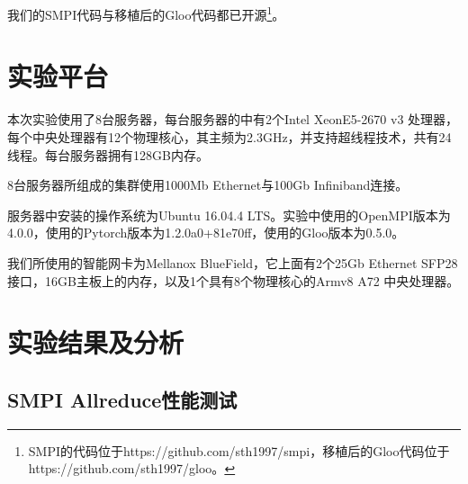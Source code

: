 我们的SMPI代码与移植后的Gloo代码都已开源\footnote{SMPI的代码位于https://github.com/sth1997/smpi，移植后的Gloo代码位于https://github.com/sth1997/gloo。}。

\section{实验平台}
本次实验使用了8台服务器，每台服务器的中有2个Intel XeonE5-2670 v3 处理器，每个中央处理器有12个物理核心，其主频为2.3GHz，并支持超线程技术，共有24线程。每台服务器拥有128GB内存。

8台服务器所组成的集群使用1000Mb Ethernet与100Gb Infiniband连接。

服务器中安装的操作系统为Ubuntu 16.04.4 LTS。实验中使用的OpenMPI版本为4.0.0，使用的Pytorch版本为1.2.0a0+81e70ff，使用的Gloo版本为0.5.0。

我们所使用的智能网卡为Mellanox BlueField，它上面有2个25Gb Ethernet SFP28 接口，16GB主板上的内存，以及1个具有8个物理核心的Armv8 A72 中央处理器。

\section{实验结果及分析}
\subsection{SMPI Allreduce性能测试}